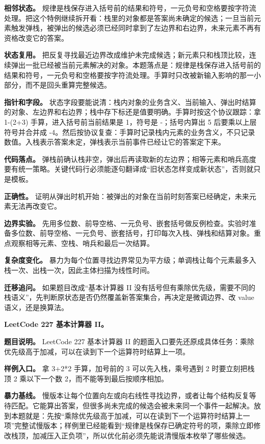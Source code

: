 \textbf{相邻状态。} 规律是栈保存进入括号前的结果和符号，一元负号和空格要按字符流处理。把这个特例继续拆开看：栈里的对象都是答案尚未确定的候选；一旦当前元素触发弹栈，被弹出的候选必须已经同时拿到了左边界和右边界，未来元素不再有资格改变它的答案。

\textbf{状态复用。} 把反复寻找最近边界改成维护未完成候选；新元素只和栈顶比较，连续弹出一批已经被当前元素解决的对象。本题落点是：规律是栈保存进入括号前的结果和符号，一元负号和空格要按字符流处理。手算时只改被新输入影响的那一小部分，而不是回头重算完整候选。

\textbf{指针和字段。} 状态字段要能说清：栈内对象的业务含义、当前输入、弹出时结算的对象、左边界和右边界；栈中存下标还是值要明确。手算时按这个协议跟踪：拿 1-(2+3) 手算，进入括号前当前结果是 1，符号是 -；括号内算出 5 后要乘以上层符号并合并成 -4。然后按协议复查：手算时记录栈内元素的业务含义，不只记录数值。入栈表示答案未定，弹栈表示当前事件已经让它的答案定下来。

\textbf{代码落点。} 弹栈前确认栈非空，弹出后再读取新的左边界；相等元素和哨兵高度要有统一策略。关键代码行必须能逐句翻译成“旧状态怎样变成新状态”，否则就只是模板。

\textbf{正确性。} 证明从弹出时机开始：被弹出的对象在当前时刻答案已经确定，未来元素无法再改变它。

\textbf{边界实验。} 先用多位数、前导空格、一元负号、嵌套括号做反例检查。实验时准备多位数、前导空格、一元负号、嵌套括号，打印每次入栈、弹栈和结算对象。重点观察相等元素、空栈、哨兵和最后一次结算。

\textbf{复杂度变化。} 暴力为每个位置寻找边界常见为平方级；单调栈让每个元素最多入栈一次、出栈一次，因此主体扫描为线性时间。

\textbf{迁移追问。} 如果题目改成“基本计算器 II 没有括号但有乘除优先级，需要不同的栈语义”，先判断原状态是否仍然覆盖新答案集合，再决定是微调边界、改 value 语义，还是换算法。

\noindent\textbf{LeetCode 227 基本计算器 II。}

\textbf{题目说明。} LeetCode 227 基本计算器 II 的题面入口要先还原成具体任务：乘除优先级高于加减，可以在读到下一个运算符时结算上一项。

\textbf{样例入口。} 拿 3+2*2 手算，加号前的 3 可以先入栈，乘号遇到 2 时要立刻把栈顶 2 乘以下一个数 2，而不能等到最后按顺序相加。

\textbf{暴力基线。} 慢版本让每个位置向左或向右线性寻找边界，或者让每个结构反复等待匹配。它能算出答案，但很多尚未完成的候选会被未来同一个事件一起解决。放到本题就是：先按“乘除优先级高于加减，可以在读到下一个运算符时结算上一项”完整试慢版本；样例里已经能看到“规律是栈保存已确定符号的项，乘除立即修改栈顶，加减压入正负项”，所以优化前必须先能说清慢版本枚举了哪些候选。


